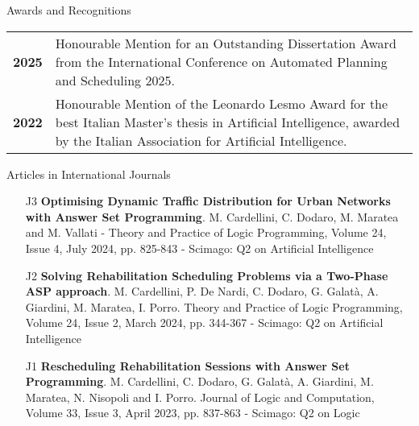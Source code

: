 \documentclass{resume} %
\begin{document}
 \begin{rSection}{Awards and Recognitions}
 \begin{tabularx}{0.95\textwidth} {lp{14cm}}
\textbf{2025} & Honourable Mention for an Outstanding Dissertation Award from the International Conference on Automated Planning and Scheduling 2025.\\
\textbf{2022}  & Honourable Mention of the Leonardo Lesmo Award for the best Italian Master’s thesis in Artificial Intelligence, awarded by the Italian Association for Artificial Intelligence. 
  \end{tabularx}
\end{rSection}

\begin{rSection}{Articles in International Journals}
\begin{enumerate}[leftmargin=5mm]
	\item[J3] \textbf{Optimising Dynamic Traffic Distribution for Urban Networks with Answer Set Programming}. M. Cardellini, C. Dodaro, M. Maratea and M. Vallati - Theory and Practice of Logic Programming,  Volume 24, Issue 4, July 2024, pp. 825-843 - Scimago: Q2 on Artificial Intelligence
	\item[J2] \textbf{Solving Rehabilitation Scheduling Problems via a Two-Phase ASP approach}. M. Cardellini, P. De Nardi, C. Dodaro, G. Galat\`a, A. Giardini, M. Maratea, I. Porro. Theory and Practice of Logic Programming, Volume 24, Issue 2, March 2024, pp. 344-367 - Scimago: Q2 on Artificial Intelligence
	\item[J1] \textbf{Rescheduling Rehabilitation Sessions with Answer Set Programming}. M. Cardellini, C. Dodaro, G. Galat\`a, A. Giardini, M. Maratea, N. Nisopoli and I. Porro. Journal of Logic and Computation, Volume 33, Issue 3, April 2023, pp. 837-863 - Scimago: Q2 on Logic
\end{enumerate}
\end{rSection}
 
\end{document}
